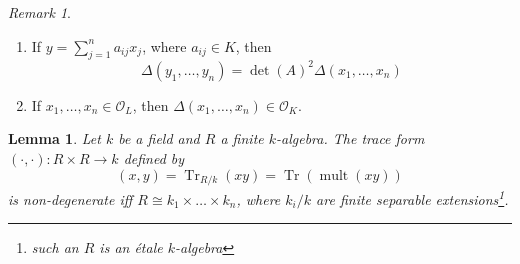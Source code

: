 \documentclass[11pt]{article}
\theoremstyle{definition}
\theoremstyle{plain}
\newtheorem{lemma}[definition]{Lemma}
\theoremstyle{remark}
\newtheorem*{remark}{Remark}
\DeclareMathOperator{\Tr}{Tr}
\DeclareMathOperator{\mult}{mult}
\newcommand{\cO}{\mathcal{O}}
\begin{document}
\begin{remark}\phantom{}
    \begin{enumerate}
        \item If $y = \sum_{j=1}^n a_{ij}x_j$, where $a_{ij} \in K$, then
            \begin{equation*}
                \Delta(y_1, \ldots, y_n) = \det(A)^2 \Delta(x_1, \ldots, x_n)
            \end{equation*}
        \item If $x_1, \ldots, x_n \in \cO_L$, then $\Delta(x_1, \ldots, x_n) \in \cO_K$.
    \end{enumerate}
\end{remark}

\begin{lemma}\label{lem:12_1}
    Let $k$ be a field and $R$ a finite $k$-algebra. The trace form $(\cdot, \cdot) : R \times R \to k$ defined by
    \begin{equation*}
        (x, y) = \Tr_{R/k}(xy) = \Tr(\mult(xy))
    \end{equation*}
    is non-degenerate iff $R \cong k_1 \times \ldots \times k_n$, where $k_i / k$ are finite separable extensions\footnote{such an $R$ is an \emph{\'etale $k$-algebra}}.
\end{lemma}
\end{document}
